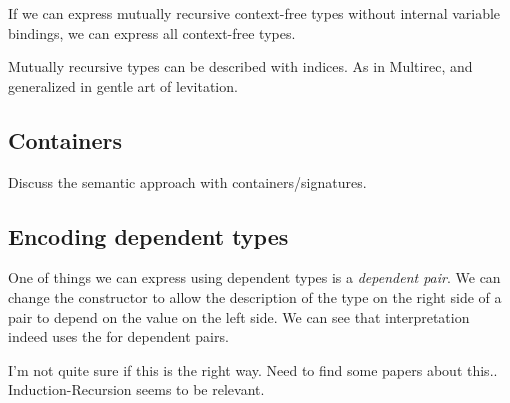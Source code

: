 If we can express mutually recursive context-free types without internal
variable bindings, we can express all context-free types.

Mutually recursive types can be described with indices. As in
Multirec, and generalized in gentle art of levitation.

\subsection{Containers}

Discuss the semantic approach with containers/signatures.


\subsection{Encoding dependent types}

One of things we can express using dependent types is a
\emph{dependent pair}.
We can change the constructor  to allow the description of
the type on the right side of a pair to depend on the value on the
left side.
We can see that interpretation indeed uses the  for dependent pairs.


\begin{shaded}
  I'm not quite sure if this is the right way.
  Need to find some papers about this..
  Induction-Recursion seems to be relevant.
\end{shaded}


